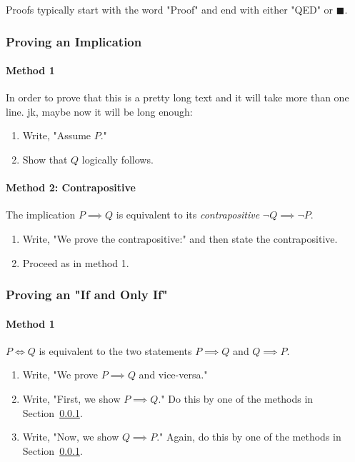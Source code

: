 \documentclass[../main.tex]{subfiles}
\begin{document}
Proofs typically start with the word "Proof" and end with either "QED" or $\blacksquare$.

\subsubsection{Proving an Implication}
\label{sec:prove_implication}

\paragraph{Method 1}

In order to prove that this is a pretty long text and it will take more than one line. jk, maybe now it will be long enough:

\begin{enumerate}
  \item Write, "Assume $P$."
  \item Show that $Q$ logically follows.
\end{enumerate}

\paragraph{Method 2: Contrapositive}
The implication $P \implies Q$ is equivalent to its \textit{contrapositive} $\neg Q \implies \neg P$.

\begin{enumerate}
  \item Write, "We prove the contrapositive:" and then state the contrapositive.
  \item Proceed as in method 1.
\end{enumerate}

\subsubsection{Proving an "If and Only If"}

\paragraph{Method 1}

$P \iff Q$ is equivalent to the two statements $P \implies Q$ and $Q \implies P$.

\begin{enumerate}
  \item Write, "We prove $P \implies Q$ and vice-versa."
  \item Write, "First, we show $P \implies Q$." Do this by one of the methods in Section~\ref{sec:prove_implication}.
  \item Write, "Now, we show $Q \implies P$." Again, do this by one of the methods in Section~\ref{sec:prove_implication}.
\end{enumerate}
\end{document}
